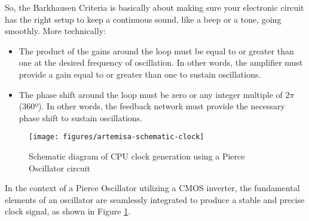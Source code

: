 So, the Barkhausen Criteria is basically about making sure your electronic circuit has the right setup to keep a continuous sound, like a beep or a tone, going smoothly. More technically:

\begin{itemize}
  \item The product of the gains around the loop must be equal to or greater than one at the desired frequency of oscillation. In other words, the amplifier must provide a gain equal to or greater than one to sustain oscillations.
  \item The phase shift around the loop must be zero or any integer multiple of $2\pi$ (360º). In other words, the feedback network must provide the necessary phase shift to sustain oscillations.
\end{itemize}


\begin{figure}[h]
  \centering
  \texttt{[image: figures/artemisa-schematic-clock]}
  \caption{Schematic diagram of CPU clock generation using a Pierce Oscillator circuit}
  \label{fig:artemisa-schematic-pierce-oscillator}
\end{figure}

In the context of a Pierce Oscillator utilizing a CMOS inverter, the fundamental elements of an oscillator are seamlessly integrated to produce a stable and precise clock signal, as shown in Figure \ref{fig:artemisa-schematic-pierce-oscillator}.

